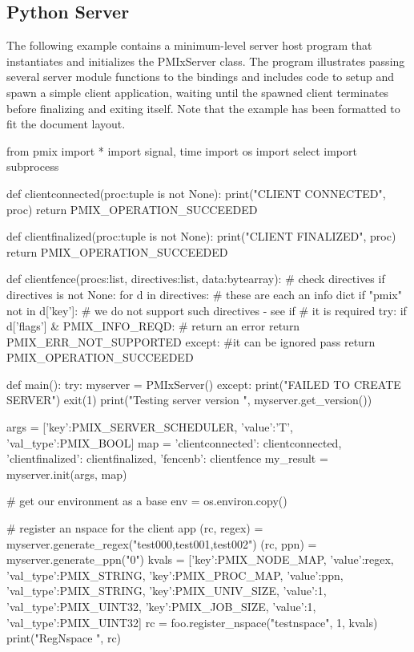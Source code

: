 \pyspecificend


\subsection{Python Server}

The following example contains a minimum-level server host program that instantiates and initializes the PMIxServer class. The program illustrates passing several server module functions to the bindings and includes code to setup and spawn a simple client application, waiting until the spawned client terminates before finalizing and exiting itself. Note that the example has been formatted to fit the document layout.

\pyspecificstart
\begin{codepar}
from pmix import *
import signal, time
import os
import select
import subprocess

def clientconnected(proc:tuple is not None):
    print("CLIENT CONNECTED", proc)
    return PMIX_OPERATION_SUCCEEDED

def clientfinalized(proc:tuple is not None):
    print("CLIENT FINALIZED", proc)
    return PMIX_OPERATION_SUCCEEDED

def clientfence(procs:list, directives:list, data:bytearray):
    # check directives
    if directives is not None:
        for d in directives:
            # these are each an info dict
            if "pmix" not in d['key']:
                # we do not support such directives - see if
                # it is required
                try:
                    if d['flags'] & PMIX_INFO_REQD:
                        # return an error
                        return PMIX_ERR_NOT_SUPPORTED
                except:
                    #it can be ignored
                    pass
    return PMIX_OPERATION_SUCCEEDED

def main():
    try:
        myserver = PMIxServer()
    except:
        print("FAILED TO CREATE SERVER")
        exit(1)
    print("Testing server version ", myserver.get_version())

    args = [{'key':PMIX_SERVER_SCHEDULER,
             'value':'T', 'val_type':PMIX_BOOL}]
    map = {'clientconnected': clientconnected,
           'clientfinalized': clientfinalized,
           'fencenb': clientfence}
    my_result = myserver.init(args, map)

    # get our environment as a base
    env = os.environ.copy()

    # register an nspace for the client app
    (rc, regex) = myserver.generate_regex("test000,test001,test002")
    (rc, ppn) = myserver.generate_ppn("0")
    kvals = [{'key':PMIX_NODE_MAP,
              'value':regex, 'val_type':PMIX_STRING},
             {'key':PMIX_PROC_MAP,
              'value':ppn, 'val_type':PMIX_STRING},
             {'key':PMIX_UNIV_SIZE,
              'value':1, 'val_type':PMIX_UINT32},
             {'key':PMIX_JOB_SIZE,
              'value':1, 'val_type':PMIX_UINT32}]
    rc = foo.register_nspace("testnspace", 1, kvals)
    print("RegNspace ", rc)


\end{codepar}

